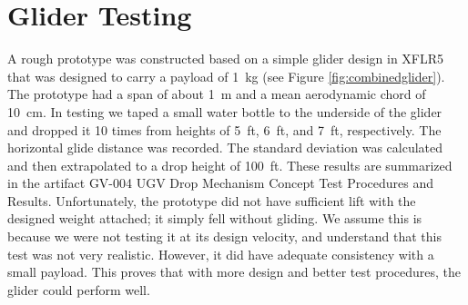 \documentclass[]{auvsi_doc}
\begin{document}
\section{Glider Testing}
A rough prototype was constructed based on a simple glider design in XFLR5 that was designed to carry a payload of 1~kg (see Figure \ref{fig:combinedglider}). The prototype had a span of about 1~m and a mean aerodynamic chord of 10~cm. In testing we taped a small water bottle to the underside of the glider and dropped it 10 times from heights of 5~ft, 6~ft, and 7~ft, respectively. The horizontal glide distance was recorded. The standard deviation was calculated and then extrapolated to a drop height of 100~ft. These results are summarized in the artifact GV-004 UGV Drop Mechanism Concept Test Procedures and Results. Unfortunately, the prototype did not have sufficient lift with the designed weight attached; it simply fell without gliding. We assume this is because we were not testing it at its design velocity, and understand that this test was not very realistic. However, it did have adequate consistency with a small payload. This proves that with more design and better test procedures, the glider could perform well. 
\end{document}
